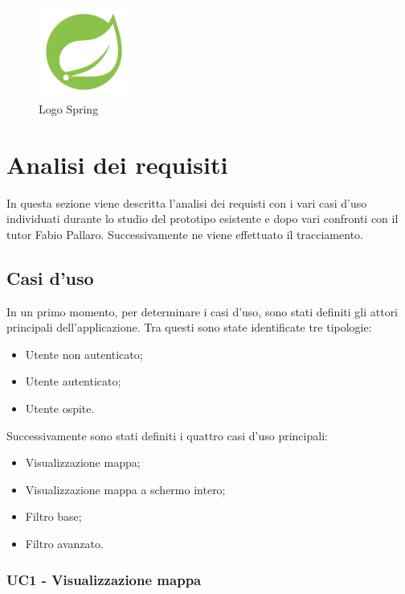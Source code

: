 \begin{figure}[htbp]	
	\centering
	\includegraphics[width=3cm]{immagini/springlogo.png}
	\caption{Logo Spring}
	\label{fig:Logo Spring}
\end{figure}

\newpage

\section{Analisi dei requisiti}
In questa sezione viene descritta l'analisi dei requisti con i  vari casi d'uso individuati durante lo studio del prototipo esistente e dopo vari confronti con il tutor Fabio Pallaro. Successivamente ne viene effettuato il tracciamento.

\subsection{Casi d'uso}
In un primo momento, per determinare i casi d'uso, sono stati definiti gli attori principali dell'applicazione.
Tra questi sono state identificate tre tipologie:
\begin{itemize}
	\item Utente non autenticato;
	\item Utente autenticato;
	\item Utente ospite.
\end{itemize}
Successivamente sono stati definiti i quattro casi d'uso principali:
\begin{itemize}
	\item Visualizzazione mappa;
	\item Visualizzazione mappa a schermo intero;
	\item Filtro base;
	\item Filtro avanzato.
\end{itemize}


\subsubsection{ UC1 - Visualizzazione mappa}

